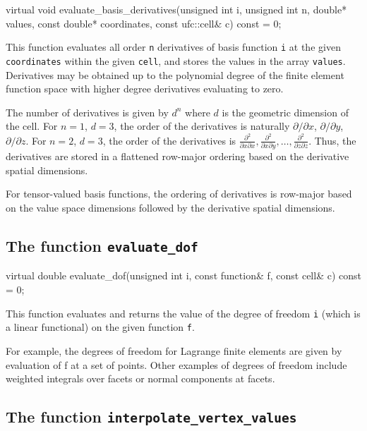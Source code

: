 \begin{code}
virtual void
evaluate_basis_derivatives(unsigned int i,
                           unsigned int n,
                           double* values,
                           const double* coordinates,
                           const ufc::cell& c) const = 0;
\end{code}

This function evaluates all order \texttt{n} derivatives of basis
function \texttt{i} at the given \texttt{coordinates} within the given
\texttt{cell}, and stores the values in the array \texttt{values}.
Derivatives may be obtained up to the polynomial degree of the finite
element function space with higher degree derivatives evaluating to
zero.

The number of derivatives is given by $d^n$ where $d$ is the geometric
dimension of the cell. For $n = 1$, $d = 3$, the order of the
derivatives is naturally $\partial/\partial x$, $\partial/\partial y$,
$\partial/\partial z$. For $n = 2$, $d = 3$, the order of the
derivatives is $\frac{\partial^2}{\partial x\partial x},
\frac{\partial^2}{\partial x\partial y}, \ldots,
\frac{\partial^2}{\partial z\partial z}$. Thus, the derivatives are
stored in a flattened row-major ordering based on the derivative
spatial dimensions.

For tensor-valued basis functions, the ordering of derivatives is
row-major based on the value space dimensions followed by the
derivative spatial dimensions.

\subsection{The function \texttt{evaluate\_dof}}

\begin{code}
virtual double evaluate_dof(unsigned int i,
                            const function& f,
                            const cell& c) const = 0;
\end{code}

This function evaluates and returns the value of the degree of freedom
\texttt{i} (which is a linear functional) on the given function
\texttt{f}.
  
For example, the degrees of freedom for Lagrange finite elements are
given by evaluation of f at a set of points. Other examples of degrees of
freedom include weighted integrals over facets or normal components at
facets.

\subsection{The function \texttt{interpolate\_vertex\_values}}

